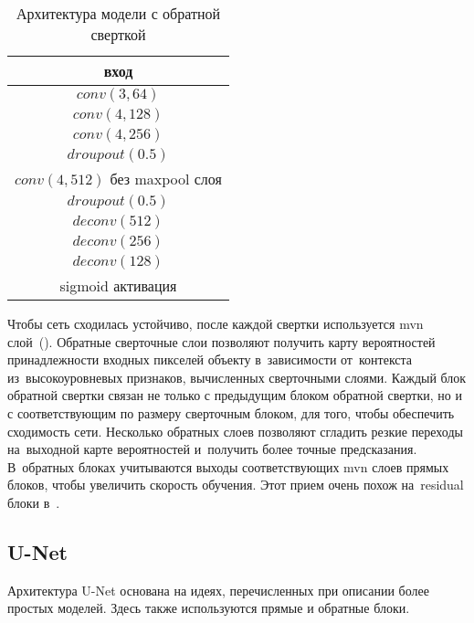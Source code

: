 \begin{table}
  \begin{center}
    \begin{tabular}{ c }
      \hline
      вход                              \\ \hline
      $conv(3,64)$                      \\ \hline
      $conv(4,128)$                     \\ \hline
      $conv(4,256)$                     \\ \hline
      $droupout(0.5)$                   \\ \hline
      $conv(4,512)$ без maxpool слоя    \\ \hline
      $droupout(0.5)$                   \\ \hline
      $deconv(512)$                     \\ \hline
      $deconv(256)$                     \\ \hline  
      $deconv(128)$                     \\ \hline      
      sigmoid активация                 \\
      \hline
    \end{tabular}
    \caption{Архитектура модели с обратной сверткой} \label{tab:fcn}
  \end{center}
\end{table}

Чтобы сеть сходилась устойчиво, после каждой свертки используется mvn слой~(\cite{batch_norm}). Обратные сверточные слои позволяют получить карту вероятностей принадлежности входных пикселей объекту в~зависимости от~контекста из~высокоуровневых признаков, вычисленных сверточными слоями. Каждый блок обратной свертки связан не только с предыдущим блоком обратной свертки, но и с соответствующим по размеру сверточным блоком, для того, чтобы обеспечить сходимость сети. Несколько обратных слоев позволяют сгладить резкие переходы на~выходной карте вероятностей и~получить более точные предсказания. В~обратных блоках учитываются выходы соответствующих mvn слоев прямых блоков, чтобы увеличить скорость обучения. Этот прием очень похож на~residual блоки в~\cite{resnet}.

\subsection{U-Net}

Архитектура U-Net \cite{unet} основана на идеях, перечисленных при описании более простых моделей. Здесь также используются прямые и обратные блоки. 


